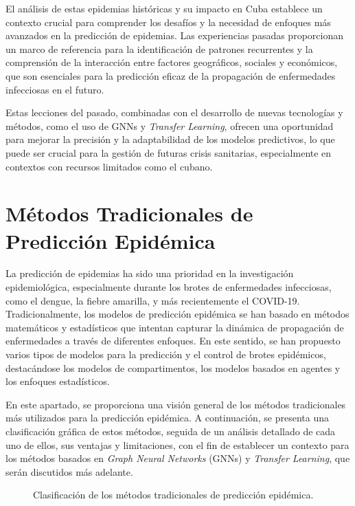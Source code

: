 El análisis de estas epidemias históricas y su impacto en Cuba establece un contexto crucial para comprender los desafíos y la necesidad de enfoques más avanzados en la predicción de epidemias. Las experiencias pasadas proporcionan un marco de referencia para la identificación de patrones recurrentes y la comprensión de la interacción entre factores geográficos, sociales y económicos, que son esenciales para la predicción eficaz de la propagación de enfermedades infecciosas en el futuro.

\noindent
Estas lecciones del pasado, combinadas con el desarrollo de nuevas tecnologías y métodos, como el uso de GNNs y \textit{Transfer Learning}, ofrecen una oportunidad para mejorar la precisión y la adaptabilidad de los modelos predictivos, lo que puede ser crucial para la gestión de futuras crisis sanitarias, especialmente en contextos con recursos limitados como el cubano.

\section{Métodos Tradicionales de Predicción Epidémica}\label{section:traditional-methods}

La predicción de epidemias ha sido una prioridad en la investigación epidemiológica, especialmente durante los brotes de enfermedades infecciosas, como el dengue, la fiebre amarilla, y más recientemente el COVID-19. Tradicionalmente, los modelos de predicción epidémica se han basado en métodos matemáticos y estadísticos que intentan capturar la dinámica de propagación de enfermedades a través de diferentes enfoques. En este sentido, se han propuesto varios tipos de modelos para la predicción y el control de brotes epidémicos, destacándose los modelos de compartimentos, los modelos basados en agentes y los enfoques estadísticos. 

En este apartado, se proporciona una visión general de los métodos tradicionales más utilizados para la predicción epidémica. A continuación, se presenta una clasificación gráfica de estos métodos, seguida de un análisis detallado de cada uno de ellos, sus ventajas y limitaciones, con el fin de establecer un contexto para los métodos basados en \textit{Graph Neural Networks} (GNNs) y \textit{Transfer Learning}, que serán discutidos más adelante.

\begin{figure}[H]
\centering
\caption{Clasificación de los métodos tradicionales de predicción epidémica.}
\end{figure}

